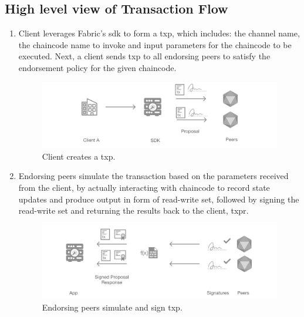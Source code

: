 \subsection{High level view of Transaction Flow}
\label{subsec:tx-flow}
\begin{enumerate}
    \item Client leverages Fabric's \acrfull{sdk} \cite{fabric-sdk-go} to form a \acrfull{txp}, which includes: the channel name, the chaincode name to invoke and input parameters for the chaincode to be executed. Next, a client sends \acrshort{txp} to all endorsing peers to satisfy the endorsement policy for the given chaincode.
    \begin{figure}[H]
        \centering
        \includegraphics[width=1\textwidth]{images/4_Fabric/step1.png}
        \caption{Client creates a \acrshort{txp}.}
        \label{fig:step1}
    \end{figure}

    \item Endorsing peers simulate the transaction based on the parameters received from the client, by actually interacting with chaincode to record state updates and produce output in form of read-write set, followed by signing the read-write set and returning the results back to the client, \acrfull{txpr}.
   \begin{figure}[H]
        \centering
        \includegraphics[width=1\textwidth]{images/4_Fabric/step2.png}
        \caption{Endorsing peers simulate and sign \acrshort{txp}.}
        \label{fig:step2}
    \end{figure}
	

\end{enumerate}
